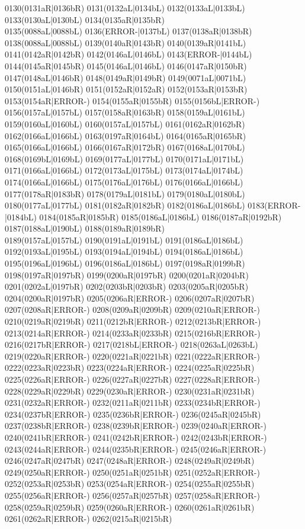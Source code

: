 0130(0131aR|0136bR) 0131(0132aL|0134bL) 0132(0133aL|0133bL) 0133(0130aL|0130bL) 0134(0135aR|0135bR) \\0135(0088aL|0088bL) 0136(ERROR-|0137bL) 0137(0138aR|0138bR) 0138(0088aL|0088bL) 0139(0140aR|0143bR) 0140(0139aR|0141bL) 0141(0142aR|0142bR) 0142(0146aL|0146bL) 0143(ERROR-|0144bL) \\0144(0145aR|0145bR) 0145(0146aL|0146bL) 0146(0147aR|0150bR) 0147(0148aL|0146bR) 0148(0149aR|0149bR) 0149(0071aL|0071bL) 0150(0151aL|0146bR) 0151(0152aR|0152aR) 0152(0153aR|0153bR) \\0153(0154aR|ERROR-) 0154(0155aR|0155bR) 0155(0156bL|ERROR-) 0156(0157aL|0157bL) 0157(0158aR|0163bR) 0158(0159aL|0161bL) 0159(0160aL|0160bL) 0160(0157aL|0157bL) 0161(0162aR|0162bR) \\0162(0166aL|0166bL) 0163(0197aR|0164bL) 0164(0165aR|0165bR) 0165(0166aL|0166bL) 0166(0167aR|0172bR) 0167(0168aL|0170bL) 0168(0169bL|0169bL) 0169(0177aL|0177bL) 0170(0171aL|0171bL) \\0171(0166aL|0166bL) 0172(0173aL|0175bL) 0173(0174aL|0174bL) 0174(0166aL|0166bL) 0175(0176aL|0176bL) 0176(0166aL|0166bL) 0177(0178aR|0183bR) 0178(0179aL|0181bL) 0179(0180aL|0180bL) \\0180(0177aL|0177bL) 0181(0182aR|0182bR) 0182(0186aL|0186bL) 0183(ERROR-|0184bL) 0184(0185aR|0185bR) 0185(0186aL|0186bL) 0186(0187aR|0192bR) 0187(0188aL|0190bL) 0188(0189aR|0189bR) \\0189(0157aL|0157bL) 0190(0191aL|0191bL) 0191(0186aL|0186bL) 0192(0193aL|0195bL) 0193(0194aL|0194bL) 0194(0186aL|0186bL) 0195(0196aL|0196bL) 0196(0186aL|0186bL) 0197(0198aR|0199bR) \\0198(0197aR|0197bR) 0199(0200aR|0197bR) 0200(0201aR|0204bR) 0201(0202aL|0197bR) 0202(0203bR|0203bR) 0203(0205aR|0205bR) 0204(0200aR|0197bR) 0205(0206aR|ERROR-) 0206(0207aR|0207bR) \\0207(0208aR|ERROR-) 0208(0209aR|0209bR) 0209(0210aR|ERROR-) 0210(0219aR|0219bR) 0211(0212bR|ERROR-) 0212(0213bR|ERROR-) 0213(0214aR|ERROR-) 0214(0233aR|0233bR) 0215(0216bR|ERROR-) \\0216(0217bR|ERROR-) 0217(0218bL|ERROR-) 0218(0263aL|0263bL) 0219(0220aR|ERROR-) 0220(0221aR|0221bR) 0221(0222aR|ERROR-) 0222(0223aR|0223bR) 0223(0224aR|ERROR-) 0224(0225aR|0225bR) \\0225(0226aR|ERROR-) 0226(0227aR|0227bR) 0227(0228aR|ERROR-) 0228(0229aR|0229bR) 0229(0230aR|ERROR-) 0230(0231aR|0231bR) 0231(0232aR|ERROR-) 0232(0211aR|0211bR) 0233(0234bR|ERROR-) \\0234(0237bR|ERROR-) 0235(0236bR|ERROR-) 0236(0245aR|0245bR) 0237(0238bR|ERROR-) 0238(0239bR|ERROR-) 0239(0240aR|ERROR-) 0240(0241bR|ERROR-) 0241(0242bR|ERROR-) 0242(0243bR|ERROR-) \\0243(0244aR|ERROR-) 0244(0235bR|ERROR-) 0245(0246aR|ERROR-) 0246(0247aR|0247bR) 0247(0248aR|ERROR-) 0248(0249aR|0249bR) 0249(0250aR|ERROR-) 0250(0251aR|0251bR) 0251(0252aR|ERROR-) \\0252(0253aR|0253bR) 0253(0254aR|ERROR-) 0254(0255aR|0255bR) 0255(0256aR|ERROR-) 0256(0257aR|0257bR) 0257(0258aR|ERROR-) 0258(0259aR|0259bR) 0259(0260aR|ERROR-) 0260(0261aR|0261bR) \\0261(0262aR|ERROR-) 0262(0215aR|0215bR) 